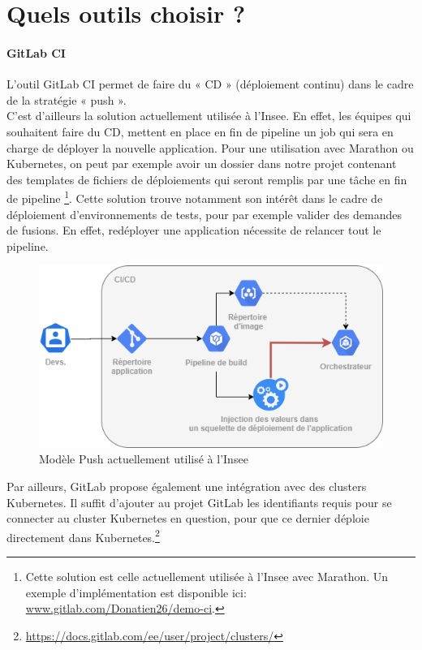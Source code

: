 \documentclass[11pt,fleqn]{book} %
\begin{document}
\section{Quels outils choisir ?}
\paragraph{GitLab CI}
L'outil GitLab CI permet de faire du « CD » (déploiement continu) dans le cadre de la stratégie « push ». \\

C’est d'ailleurs la solution actuellement utilisée à l'Insee. En effet, les équipes qui souhaitent faire du CD, mettent en place en fin de pipeline un job qui sera en charge de déployer la nouvelle application. Pour une utilisation avec Marathon ou Kubernetes, on peut par exemple avoir un dossier dans notre projet contenant des templates de fichiers de déploiements qui seront remplis par une tâche en fin de pipeline \footnote{Cette solution est celle actuellement utilisée à l'Insee avec Marathon. Un exemple d'implémentation est disponible ici: \url{www.gitlab.com/Donatien26/demo-ci}.}. Cette solution trouve notamment son intérêt dans le cadre de déploiement d'environnements de tests, pour par exemple valider des demandes de fusions. En effet, redéployer une application nécessite de relancer tout le pipeline.\\

\begin{figure}[H]\centering
\renewcommand{\figurename}{Schéma}
\includegraphics[scale=0.55]{Pictures/CI-CD/insee-model.png}
\captionsetup{margin=1.5cm,format=hang,justification=justified}
\caption[]{Modèle Push actuellement utilisé à l'Insee \newline}
\end{figure}

Par ailleurs, GitLab propose également une intégration avec des clusters Kubernetes. Il suffit d’ajouter au projet GitLab les identifiants requis pour se connecter au cluster Kubernetes en question, pour que ce dernier déploie directement dans Kubernetes.\footnote{\url{https://docs.gitlab.com/ee/user/project/clusters/}}
\end{document}
